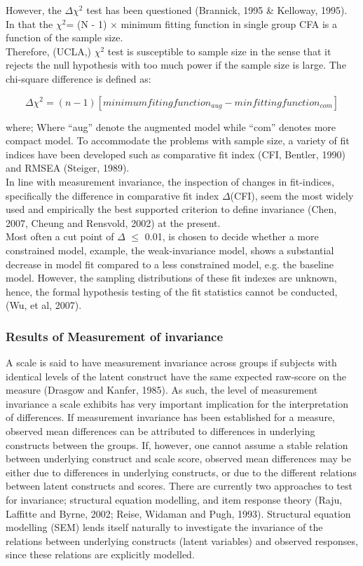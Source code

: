 \documentclass[12pt]{article}
\begin{document}
\noindent However, the $\Delta{\chi}^2$ test has been questioned (Brannick, 1995 \& Kelloway, 1995). In that the ${\chi}^2$= (N - 1) × minimum fitting function in single group CFA is a function of the sample size. \\
Therefore, (UCLA,) ${\chi}^2$ test is susceptible to sample size in the sense that it rejects the null hypothesis with too much power if the sample size is large. The chi-square difference is defined as:

$$\Delta{\chi}^2 = (n-1)[minimumfitingfunction_{aug} - minfittingfunction_{com}]$$

\noindent where;
Where “aug” denote the augmented model while “com” denotes more compact model. To accommodate the problems with sample size, a variety of fit indices have been developed such as comparative fit index (CFI, Bentler, 1990) and RMSEA (Steiger, 1989). \\
In line with measurement invariance, the inspection of changes in fit-indices, specifically the difference in comparative fit index $\Delta$(CFI), seem the most widely used and empirically the best supported criterion to define invariance (Chen, 2007, Cheung and Rensvold, 2002) at the present. \\
Most often a cut point of $\Delta$ $\leq$ 0.01, is chosen to decide whether a more constrained model, example, the weak-invariance model, shows a substantial decrease in model fit compared to a less constrained model, e.g. the baseline model. However, the sampling distributions of these fit indexes are unknown, hence, the formal hypothesis testing of the fit statistics cannot be conducted, (Wu, et al, 2007).
\subsubsection{Results of Measurement of invariance}

A scale is said to have measurement invariance across groups if subjects with identical levels of the latent construct have the same expected raw-score on the measure (Drasgow and Kanfer, 1985). As such, the level of measurement invariance a scale exhibits has very important implication for the interpretation of differences. If measurement invariance has been established for a measure, observed mean differences can be attributed to differences in underlying constructs between the groups. If, however, one cannot assume a stable relation between underlying construct and scale score, observed mean differences may be either due to differences in underlying constructs, or due to the different relations between latent constructs and scores. 
There are currently two approaches to test for invariance; structural equation modelling, and item response theory (Raju, Laffitte and Byrne, 2002; Reise, Widaman and Pugh, 1993). Structural equation modelling (SEM) lends itself naturally to investigate the invariance of the relations between underlying constructs (latent variables) and observed responses, since these relations are explicitly modelled.
\newpage
\end{document}
